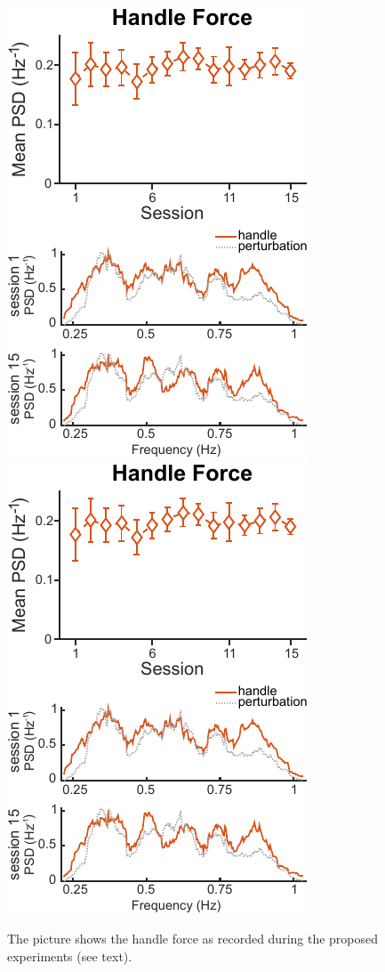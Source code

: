 \documentclass[final,5p,twocolumn]{elsarticle}
\begin{document}
\begin{figure}
	\begin{center}
		\includegraphics[width=0.45\linewidth]{images/HandleForce-all-1.pdf}
		\includegraphics[width=0.45\linewidth]{images/HandleForce-all-2.pdf}
		\caption{The picture shows the handle force as recorded during the proposed experiments (see text).}
		\label{fig:HandleForces}
	\end{center}
\end{figure}
\end{document}
